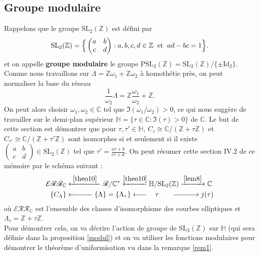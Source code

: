 \documentclass[a4paper]{article}
\begin{document}
\subsection{Groupe modulaire}
\noindent Rappelons que le groupe $\text{SL}_{2}(\mathbb{Z})$ est défini par
\begin{equation*}
\text{SL}_{2}(\mathbb{Z})=\Big\{\begin{pmatrix} 
a & b \\
c & d 
\end{pmatrix} : a,b,c,d \in \mathbb{Z} \hspace{0.2cm} \text{et}
\hspace{0.2cm} ad-bc=1 \Big\}.
\end{equation*}
et on appelle \textbf{groupe modulaire} le groupe $\text{PSL}_{2}(\mathbb{Z})=\text{SL}_{2}(\mathbb{Z})/\{\pm \text{Id}_2\}$.
\\
\noindent Comme nous travaillons sur $\Lambda=\mathbb{Z}\omega_{1}+\mathbb{Z}\omega_{2}$ à homothétie près, on peut normaliser la base du réseau
\begin{equation*}
\frac{1}{\omega_{2}}\Lambda=\mathbb{Z}\frac{\omega_{1}}{\omega_{2}}+\mathbb{Z}.
\end{equation*}
On peut alors choisir $\omega_1,\omega_2 \in \mathbb{C}$ tel que $\Im(\omega_{1}/\omega_{2})>0$, ce qui nous suggère de travailler sur le demi-plan supérieur $\mathbb{H}=\{\tau \in \mathbb{C} : \Im(\tau)>0\}$ de $\mathbb{C}$. Le but de cette section est démontrer que pour $\tau, \tau' \in \mathbb{H}$, $C_\tau \cong \mathbb{C} /(\mathbb{Z}+\tau\mathbb{Z})$ et $C_{\tau'} \cong \mathbb{C} /(\mathbb{Z}+\tau'\mathbb{Z})$ sont isomorphes si et seulement si il existe
$ \begin{pmatrix} 
a & b \\
c & d 
\end{pmatrix} \in \text{SL}_{2}(\mathbb{Z})$ tel que $\tau'=\frac{a\tau+b}{c\tau+d}$.
\noindent On peut résumer cette section IV.2 de ce mémoire par le schéma suivant :
\begin{align*}
\mathcal{E}\mathscr{R}\mathscr{R}_\mathbb{C} &\xleftarrow{\makebox[1.4cm]{\ref{theo10}}} \mathscr{R}/\mathbb{C}^* \xleftarrow{\makebox[1cm]{\ref{theo10}}} \mathbb{H} /\text{SL}_{2}(\mathbb{Z}) \xrightarrow{\makebox[1cm]{\ref{lem8}}}  \mathbb{C} \\
\{C_\Lambda\} &\xleftarrow{\makebox[1cm]{}} \{\Lambda\}=\{\Lambda_\tau \} \xleftarrow{\makebox[0.5cm]{}}\hspace{0.3cm} \tau \hspace{0.6cm} \xrightarrow{\makebox[1.1cm]{}} j(\tau)
\end{align*}
où $\mathcal{E}\mathscr{R}\mathscr{R}_\mathbb{C}$ est l'ensemble des classes d'isomorphisme des courbes elliptiques et \\
$\Lambda_\tau=\mathbb{Z}+\tau\mathbb{Z}$.
\\
Pour démontrer cela, on va décrire l'action de groupe de $\text{SL}_2(\mathbb{Z})$ sur $\mathbb{H}$ (qui sera définie dans la proposition \ref{modul}) et on va  utiliser les fonctions modulaires pour démontrer le théorème d'uniformisation vu dans la remarque \ref{rem1}.
\end{document}

